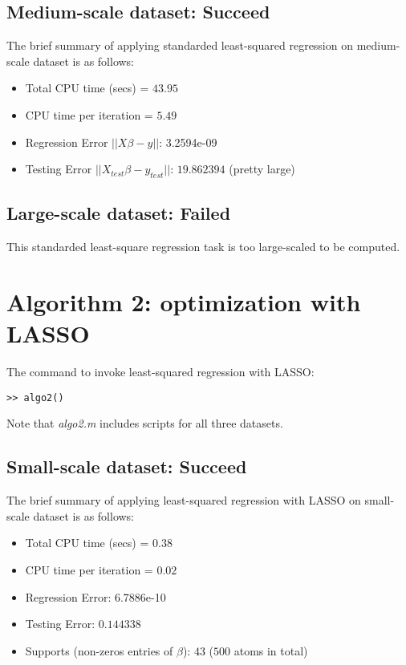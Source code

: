 \documentclass[11pt,a4paper]{report}
\begin{document}
\subsection{Medium-scale dataset: Succeed}
The brief summary of applying standarded least-squared regression on
medium-scale dataset is as follows:
\begin{itemize}
 \item   Total CPU time (secs)  = $43.95$  

 \item   CPU time per iteration = $5.49$ 

 \item   Regression Error $||X \beta - y||$: 3.2594e-09
    
  \item  Testing Error $||X_{test} \beta - y_{test}||$: $19.862394$ (pretty large)
\end{itemize}
\subsection{Large-scale dataset: Failed}
    
    This standarded least-square regression task is too large-scaled to be computed. 

\newpage
\section{Algorithm 2: optimization with LASSO}
The command to invoke least-squared regression with LASSO:
\begin{verbatim}
>> algo2()
\end{verbatim}
Note that {\it algo2.m} includes scripts for all three datasets.
\subsection{Small-scale dataset: Succeed}
The brief summary of applying least-squared regression with LASSO on
small-scale dataset is as follows:
\begin{itemize}
 \item   Total CPU time (secs)  = $0.38$ 

 \item   CPU time per iteration = $0.02$  

 \item   Regression Error: 6.7886e-10

 \item   Testing Error: $0.144338$

 \item   Supports (non-zeros entries of $\beta$): $43$ ($500$ atoms in total)
\end{itemize}
\end{document}
